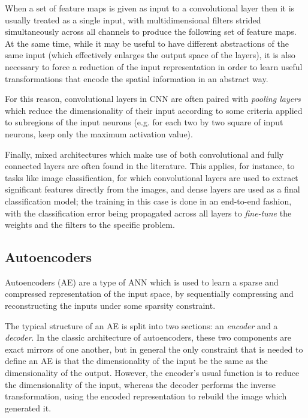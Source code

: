 When a set of feature maps is given as input to a convolutional layer then it is
usually treated as a single input, with multidimensional filters strided 
simultaneously across all channels to produce the following set of feature maps. \\

At the same time, while it may be useful to have different abstractions of the
same input (which effectively enlarges the output space of the layers), it is
also necessary to force a reduction of the input representation in order to 
learn useful transformations that encode the spatial information in an abstract 
way. 

For this reason, convolutional layers in CNN are often paired with 
\textit{pooling layers} which reduce the dimensionality of their input according
to some criteria applied to subregions of the input neurons (e.g. for each two by
two square of input neurons, keep only the maximum activation value). 

Finally, mixed architectures which make use of both convolutional and fully
connected layers are often found in the literature. This applies, for instance, 
to tasks like image classification, for which convolutional layers are used to 
extract significant features directly from the images, and dense layers are used
as a final classification model; the training in this case is done in an 
end-to-end fashion, with the classification error being propagated across all 
layers to \textit{fine-tune} the weights and the filters to the specific problem.

\subsection{Autoencoders}
Autoencoders (AE) are a type of ANN which is used to learn a sparse and 
compressed representation of the input space, by sequentially compressing and 
reconstructing the inputs under some sparsity constraint.

The typical structure of an AE is split into two sections: an 
\textit{encoder} and a \textit{decoder}. In the classic architecture of 
autoencoders, these two components are exact mirrors of one another, but in 
general the only constraint that is needed to define an AE is that
the dimensionality of the input be the same as the dimensionality of the output.
However, the encoder's usual function is to reduce the dimensionality of the 
input, whereas the decoder performs the inverse transformation, using the 
encoded representation to rebuild the image which generated it. \\

